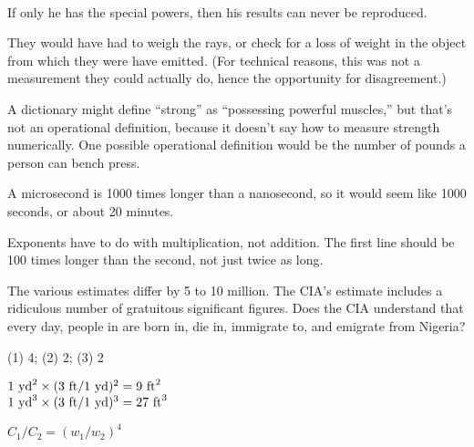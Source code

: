 	
	




\noindent{}


\noindent{}\\

If only he has the special powers, then his results can never be
reproduced.

They would have had to weigh the rays, or check for a loss of weight  in
 the object from which they were have
emitted.  (For technical reasons, this was not a measurement
 they could actually do, hence the opportunity for
disagreement.)

A dictionary might define ``strong'' as ``possessing powerful muscles,''
but that's not an operational definition, because
it doesn't say how to measure strength numerically. 
 One possible operational definition would be the number of
pounds a person can bench press.

A microsecond is 1000 times longer than a nanosecond, so it would seem like 1000 seconds, or about 20 minutes.

Exponents have to do with multiplication, not addition. The
first line should be 100 times longer than the second,
not just twice as long.

The various estimates differ by 5 to 10 million. The
CIA's estimate includes a ridiculous number of gratuitous
significant figures. Does the CIA understand that every
day, people in are born in, die in,  immigrate to, and
emigrate from Nigeria?

(1) 4; (2) 2; (3) 2

$1\ \zu{yd}^2\times(3\ \zu{ft}/1\ \zu{yd})^2=9\ \zu{ft}^2$\\
$1\ \zu{yd}^3\times(3\ \zu{ft}/1\ \zu{yd})^3=27\ \zu{ft}^3$

$C_1/C_2=(w_1/w_2)^4$


